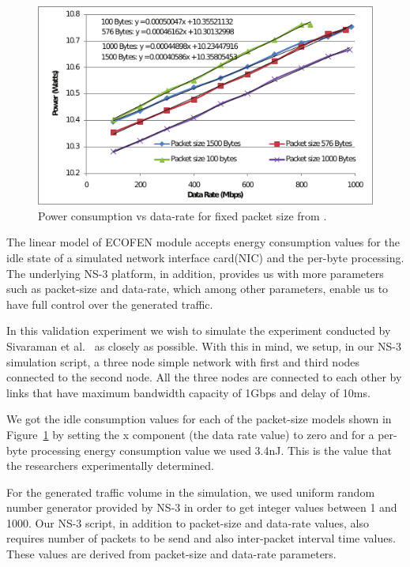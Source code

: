 \begin{figure}[ht]
	\begin{center}
		\includegraphics{images/powervsdatarate1.pdf}
		\caption{Power consumption vs data-rate for fixed packet size from \cite{Sivaraman}.}
		\label{fig:powervsdatarate1}
	\end{center}
\end{figure}

The linear model of ECOFEN module accepts energy consumption values for the idle state of a simulated network interface card(NIC) and the per-byte processing. The underlying NS-3 platform, in addition, provides us with more parameters such as packet-size and data-rate, which among other parameters, enable us to have full control over the generated traffic.

In this validation experiment we wish to simulate the experiment conducted by Sivaraman et al.{\ } as closely as possible. With this in mind, we setup, in our NS-3 simulation script, a three node simple network with first and third nodes connected to the second node. All the three nodes are connected to each other by links that have maximum bandwidth capacity of 1Gbps and delay of 10ms. 

We got the idle consumption values for each of the packet-size models shown in Figure~\ref{fig:powervsdatarate1} by setting the x component (the data rate value) to zero and for a per-byte processing energy consumption value we used 3.4nJ. This is the value that the researchers experimentally determined. 

For the generated traffic volume in the simulation, we used uniform random number generator provided by NS-3 in order to get integer values between 1 and 1000. Our NS-3 script, in addition to packet-size and data-rate values, also requires number of packets to be send and also inter-packet interval time values. These values are derived from packet-size and data-rate parameters. 


